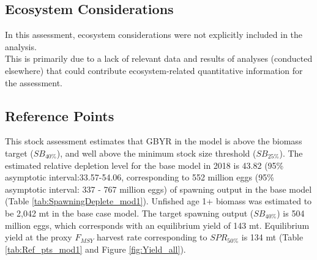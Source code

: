 \documentclass[12pt,]{article}
\begin{document}
\FloatBarrier

\subsection*{Ecosystem Considerations}\label{ecosystem-considerations}

In this assessment, ecosystem considerations were not explicitly
included in the analysis.\\
This is primarily due to a lack of relevant data and results of analyses
(conducted elsewhere) that could contribute ecosystem-related
quantitative information for the assessment.

\subsection*{Reference Points}\label{reference-points}

This stock assessment estimates that GBYR in the model is above the
biomass target (\(SB_{40\%}\)), and well above the minimum stock size
threshold (\(SB_{25\%}\)). The estimated relative depletion level for
the base model in 2018 is 43.82 (95\% asymptotic interval:33.57-54.06,
corresponding to 552 million eggs (95\% asymptotic interval: 337 - 767
million eggs) of spawning output in the base model (Table
\ref{tab:SpawningDeplete_mod1}). Unfished age 1+ biomass was estimated
to be 2,042 mt in the base case model. The target spawning output
(\(SB_{40\%}\)) is 504 million eggs, which corresponds with an
equilibrium yield of 143 mt. Equilibrium yield at the proxy \(F_{MSY}\)
harvest rate corresponding to \(SPR_{50\%}\) is 134 mt (Table
\ref{tab:Ref_pts_mod1} and Figure \ref{fig:Yield_all}).

\FloatBarrier
\end{document}
